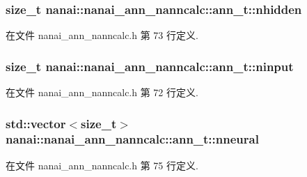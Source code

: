 \subsubsection[{nhidden}]{\setlength{\rightskip}{0pt plus 5cm}size\+\_\+t nanai\+::nanai\+\_\+ann\+\_\+nanncalc\+::ann\+\_\+t\+::nhidden}\label{classnanai_1_1nanai__ann__nanncalc_1_1ann__t_aae78b45e2e8e764fbf1797fd8663c299}


在文件 nanai\+\_\+ann\+\_\+nanncalc.\+h 第 73 行定义.

\hypertarget{classnanai_1_1nanai__ann__nanncalc_1_1ann__t_ac1d98edc134d7b8aaf44c2d9c3516a1f}{}
\subsubsection[{ninput}]{\setlength{\rightskip}{0pt plus 5cm}size\+\_\+t nanai\+::nanai\+\_\+ann\+\_\+nanncalc\+::ann\+\_\+t\+::ninput}\label{classnanai_1_1nanai__ann__nanncalc_1_1ann__t_ac1d98edc134d7b8aaf44c2d9c3516a1f}


在文件 nanai\+\_\+ann\+\_\+nanncalc.\+h 第 72 行定义.

\hypertarget{classnanai_1_1nanai__ann__nanncalc_1_1ann__t_a1d66bbaf003a36733135f7e43df76d90}{}
\subsubsection[{nneural}]{\setlength{\rightskip}{0pt plus 5cm}std\+::vector$<$size\+\_\+t$>$ nanai\+::nanai\+\_\+ann\+\_\+nanncalc\+::ann\+\_\+t\+::nneural}\label{classnanai_1_1nanai__ann__nanncalc_1_1ann__t_a1d66bbaf003a36733135f7e43df76d90}


在文件 nanai\+\_\+ann\+\_\+nanncalc.\+h 第 75 行定义.

\hypertarget{classnanai_1_1nanai__ann__nanncalc_1_1ann__t_aaae404e72445cd09ff003c74c41e9954}{}

